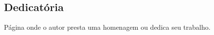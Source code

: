 \newpage %
\thispagestyle{empty} %
\clearpage %

\begin{center}
    \section*{Dedicatória} %
\end{center}

Página onde o autor presta uma homenagem ou dedica seu trabalho.

\thispagestyle{empty} %
\clearpage %
